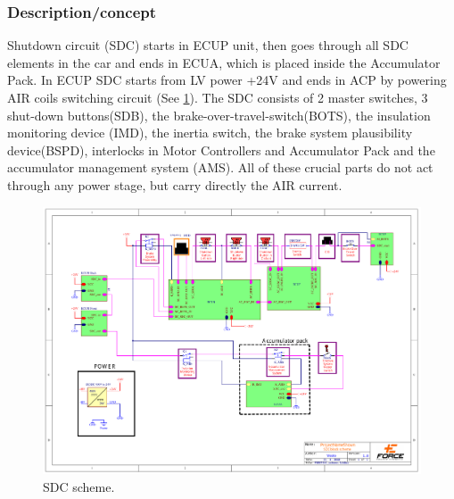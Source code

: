 
\subsubsection{Description/concept}

Shutdown circuit (SDC) starts in ECUP unit, then goes through all SDC elements in the car and ends in ECUA, which is placed inside the Accumulator Pack. In ECUP SDC starts from LV power +24V and ends in ACP by powering AIR coils switching circuit (See \ref{fig:SDC-scheme}). The SDC consists of 2 master switches, 3 shut-down buttons(SDB), the brake-over-travel-switch(BOTS), the insulation monitoring device (IMD), the inertia switch, the brake system plausibility device(BSPD), interlocks in Motor Controllers and Accumulator Pack and the accumulator management system (AMS). All of these crucial parts do not act through any power stage, but carry directly the AIR current.

\begin{figure}[H]
	\includegraphics[width=\textwidth, trim={2cm 3cm 2cm 2cm},clip]{./img/sdc-scheme.pdf}
	\caption{SDC scheme.}
	\label{fig:SDC-scheme}
\end{figure}


